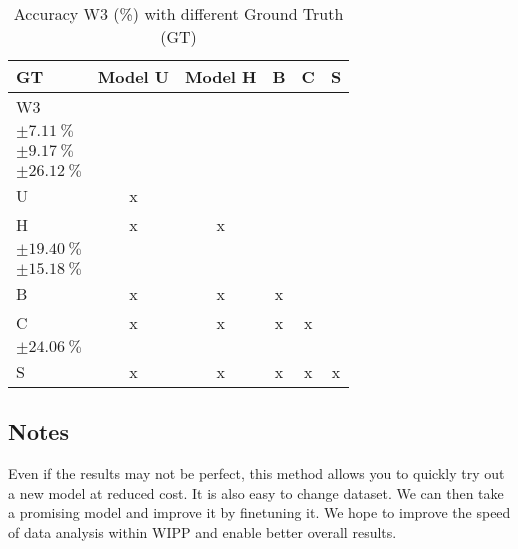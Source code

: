 \begin{table}[H]
\small
\centering
\caption{\label{tab:base3dRPEdatamask}%
  Accuracy W3 (\%) with different Ground Truth (GT)
}
\begin{tabular}{lccccc}
  \toprule
  GT & Model U & Model H & B & C & S \\
  \midrule
  W3 &  & \makecell{$\SI{91.87}{\percent}$ \\ $\pm \SI{7.11}{\percent}$} &  & \makecell{$\SI{27.46}{\percent}$ \\ $\pm \SI{9.17}{\percent}$} & \makecell{$\SI{77.69}{\percent}$ \\ $\pm \SI{26.12}{\percent}$} \\
  U & x &  &  &  &  \\
  H & x & x &  & \makecell{$\SI{42.42}{\percent}$ \\ $\pm \SI{19.40}{\percent}$}  & \makecell{$\SI{89.42}{\percent}$ \\ $\pm \SI{15.18}{\percent}$} \\
  B & x & x & x &  &  \\
  C & x & x & x & x & \makecell{$\SI{59.18}{\percent}$ \\ $\pm \SI{24.06}{\percent}$} \\
  S & x & x & x & x &  x \\
  \bottomrule
\end{tabular}
\end{table}





\subsection{Notes}

Even if the results may not be perfect, this method allows you to quickly try
out a new model at reduced cost. It is also easy to change dataset. We can then
take a promising model and improve it by finetuning it. We hope to improve the
speed of data analysis within WIPP and enable better overall results.
